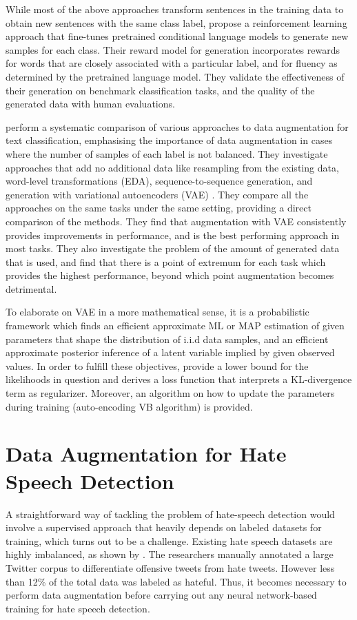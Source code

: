 \documentclass[11pt,a4paper]{article}
\begin{document}
While most of the above approaches transform sentences in the training data to obtain new sentences with the same class label, \citet{liu-etal-2020-data} propose a reinforcement learning approach that fine-tunes pretrained conditional language models to generate new samples for each class. Their reward model for generation incorporates rewards for words that are closely associated with a particular label, and for fluency as determined by the pretrained language model. They validate the effectiveness of their generation on benchmark classification tasks, and the quality of the generated data with human evaluations.

\citet{xu-etal-2020-data} perform a systematic comparison of various approaches to data augmentation for text classification, emphasising the importance of data augmentation in cases where the number of samples of each label is not balanced. They investigate approaches that add no additional data like resampling from the existing data, word-level transformations (EDA), sequence-to-sequence generation, and generation with variational autoencoders (VAE) \cite{kingma2014autoencoding}. They compare all the approaches on the same tasks under the same setting, providing a direct comparison of the methods. They find that augmentation with VAE consistently provides improvements in performance, and is the best performing approach in most tasks. They also investigate the problem of the amount of generated data that is used, and find that there is a point of extremum for each task which provides the highest performance, beyond which point augmentation becomes detrimental.

To elaborate on VAE in a more mathematical sense, it is a probabilistic framework which finds an efficient approximate ML or MAP estimation of given parameters that shape the distribution of i.i.d data samples, and an efficient approximate posterior inference of a latent variable implied by given observed values. In order to fulfill these objectives, \citet{kingma2014autoencoding} provide a lower bound for the likelihoods in question and derives a loss function that interprets a KL-divergence term as regularizer. Moreover, an algorithm on how to update the parameters during training (auto-encoding VB algorithm) is provided.

\section{Data Augmentation for Hate Speech Detection}
A straightforward way of tackling the problem of hate-speech detection would involve a supervised approach that heavily depends on labeled datasets for training, which turns out to be a challenge. Existing hate speech datasets are highly imbalanced, as shown by \citet{davidson2017automated}.
The researchers manually annotated a large Twitter corpus to differentiate offensive tweets from hate tweets. However less than 12\% of the total data was labeled as hateful. Thus, it becomes necessary to perform data augmentation before carrying out any neural network-based training for hate speech detection.
\end{document}
